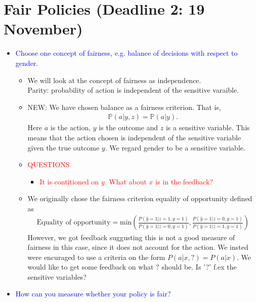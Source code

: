 
\section*{Fair Policies (Deadline 2: 19 November)}
\begin{itemize}
    \item \textcolor{blue}{Choose one concept of fairness, e.g. balance of decisions with respect to gender.}
    \begin{itemize}
        \item We will look at the concept of fairness as independence. \\
        Parity: probability of action is independent of the sensitive varaible. 
        \item NEW: We have chosen balance as a fairness criterion. That is, 
        \begin{align*}
            \mathbb{P}(a|y,z) = \mathbb{P}(a|y)
        .\end{align*}
        Here $a$ is the action, $y$ is the outcome and $z$ is a sensitive variable. 
        This means that the action chosen is independent of the sensitive variable given the true outcome $y$. 
        We regard gender to be a sensitive variable. 
        \item \textcolor{red}{QUESTIONS}
        \begin{itemize}
            \item \textcolor{red}{It is contitioned on $y$. What about $x$ is in the feedback?}
        \end{itemize}
        \item We originally chose the fairness criterion equality of opportunity defined as 
        \begin{align*}
            \text{Equality of opportunity} = \text{min} \left( \frac{P(\hat{y} = 1 | z = 1, y = 1)}{P(\hat{y} = 1 | z=0, y=1)} , \frac{P(\hat{y} = 1 | z = 0, y = 1)}{P(\hat{y} = 1 | z=1, y=1)}\right)
        \end{align*}
        However, we got feedback suggusting this is not a good measure of fairness in this case, since it does not account for the action. 
        We insted were encuraged to use a criteria on the form $P(a|x,?) = P(a|x)$. 
        We would like to get some feedback on what $?$ should be. Is '?' f.ex the sensitive variables?
    \end{itemize}
    \item \textcolor{blue}{How can you measure whether your policy is fair?}
    \begin{itemize}

\end{itemize}
\end{itemize}
